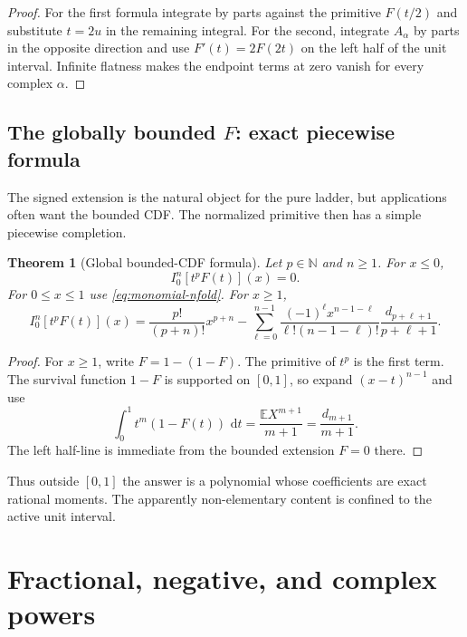 \documentclass[11pt,oneside]{article}
\numberwithin{equation}{section}
\newtheorem{theorem}{Theorem}[section]
\theoremstyle{definition}
\theoremstyle{remark}
\newcommand{\N}{\mathbb N}
\newcommand{\E}{\mathbb E}
\newcommand{\dd}{\,\mathrm d}
\begin{document}
\begin{proof}
For the first formula integrate by parts against the primitive $F(t/2)$ and substitute
$t=2u$ in the remaining integral.  For the second, integrate
$A_\alpha$ by parts in the opposite direction and use $F'(t)=2F(2t)$ on the left half of the
unit interval.  Infinite flatness makes the endpoint terms at zero vanish for every complex
$\alpha$.
\end{proof}

\subsection{The globally bounded \texorpdfstring{$F$}{F}: exact piecewise formula}

The signed extension is the natural object for the pure ladder, but applications often want
the bounded CDF.  The normalized primitive then has a simple piecewise completion.

\begin{theorem}[Global bounded-CDF formula]
\label{thm:global-bounded}
Let $p\in\N$ and $n\ge1$.  For $x\le0$,
\begin{equation}
 I_0^n[t^pF(t)](x)=0.                                        \label{eq:global-left}
\end{equation}
For $0\le x\le1$ use \eqref{eq:monomial-nfold}.  For $x\ge1$,
\begin{equation}
 \boxed{
 I_0^n[t^pF(t)](x)
 =\frac{p!}{(p+n)!}x^{p+n}
 -\sum_{\ell=0}^{n-1}
 \frac{(-1)^\ell x^{n-1-\ell}}{\ell!(n-1-\ell)!}
 \frac{d_{p+\ell+1}}{p+\ell+1}.}
 \label{eq:global-right}
\end{equation}
\end{theorem}

\begin{proof}
For $x\ge1$, write $F=1-(1-F)$.  The primitive of $t^p$ is the first term.  The survival
function $1-F$ is supported on $[0,1]$, so expand $(x-t)^{n-1}$ and use
\[
 \int_0^1t^m(1-F(t))\,\dd t=\frac{\E X^{m+1}}{m+1}=\frac{d_{m+1}}{m+1}.
\]
The left half-line is immediate from the bounded extension $F=0$ there.
\end{proof}

Thus outside $[0,1]$ the answer is a polynomial whose coefficients are exact rational
moments.  The apparently non-elementary content is confined to the active unit interval.

\section{Fractional, negative, and complex powers}
\label{sec:fractional}
\end{document}
